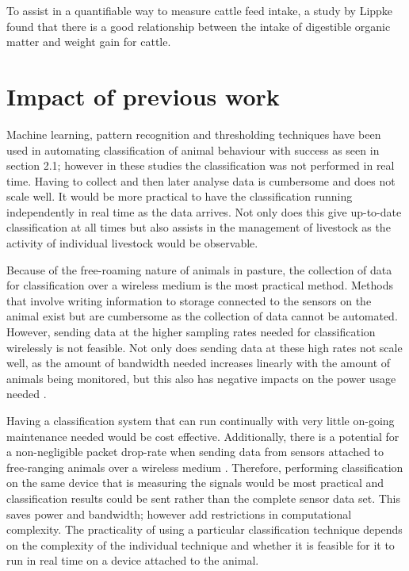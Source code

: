 To assist in a quantifiable way to measure cattle feed intake, a study by Lippke \cite{Lippke1980} found that there is a good relationship between the intake of digestible organic matter and weight gain for cattle. 

\section{Impact of previous work}

Machine learning, pattern recognition and thresholding techniques have been used in automating classification of animal behaviour with success as seen in section 2.1; however in these studies the classification was not performed in real time. Having to collect and then later analyse data is cumbersome and does not scale well. It would be more practical to have the classification running independently in real time as the data arrives. Not only does this give up-to-date classification at all times but also assists in the management of livestock as the activity of individual livestock would be observable. 

Because of the free-roaming nature of animals in pasture, the collection of data for classification over a wireless medium is the most practical method. Methods that involve writing information to storage connected to the sensors on the animal exist but are cumbersome as the collection of data cannot be automated. However, sending data at the higher sampling rates needed for classification \cite{Guo2006} \cite{Clapham2011} wirelessly is not feasible. Not only does sending data at these high rates not scale well, as the amount of bandwidth needed increases linearly with the amount of animals being monitored, but this also has negative impacts on the power usage needed \cite{Nadimi2012}. 

Having a classification system that can run continually with very little on-going maintenance needed would be cost effective. Additionally, there is a potential for a non-negligible packet drop-rate when sending data from sensors attached to free-ranging animals over a wireless medium \cite{Nadimi2012}. Therefore, performing classification on the same device that is measuring the signals would be most practical and classification results could be sent rather than the complete sensor data set. This saves power and bandwidth; however add restrictions in computational complexity. The practicality of using a particular classification technique depends on the complexity of the individual technique and whether it is feasible for it to run in real time on a device attached to the animal.

